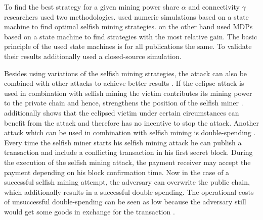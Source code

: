\documentclass{scrartcl}
\begin{document}
To find the best strategy for a given mining power share $\alpha$ and connectivity $\gamma$ researchers used two methodologies. \cite{gervais2015tampering, nayak2016stubborn} used numeric simulations based on a state machine to find optimal selfish mining strategies. \cite{sapirshtein2016optimal, gervais2016security} on the other hand used MDPs based on a state machine to find strategies with the most relative gain. The basic principle of the used state machines is for all publications the same. To validate their results \citep{eyal2014majority, sapirshtein2016optimal} additionally used a closed-source simulation.

Besides using variations of the selfish mining strategies, the attack can also be combined with other attacks to achieve better results \cite{gervais2016security, sapirshtein2016optimal, nayak2016stubborn, gervais2015tampering}. If the eclipse attack is used in combination with selfish mining the victim contributes its mining power to the private chain and hence, strengthens the position of the selfish miner \cite{nayak2016stubborn, gervais2016security}. \cite{nayak2016stubborn} additionally shows that the eclipsed victim under certain circumstances can benefit from the attack and therefore has no incentive to stop the attack. Another attack which can be used in combination with selfish mining is double-spending \cite{sapirshtein2016optimal, gervais2016security}. Every time the selfish miner starts his selfish mining attack he can publish a transaction and include a conflicting transaction in his first secret block. During the execution of the selfish mining attack, the payment receiver may accept the payment depending on his block confirmation time. Now in the case of a successful selfish mining attempt, the adversary can overwrite the public chain, which additionally results in a successful double spending. The operational costs of unsuccessful double-spending can be seen as low because the adversary still would get some goods in exchange for the transaction \cite{sapirshtein2016optimal, gervais2016security}.
\end{document}
